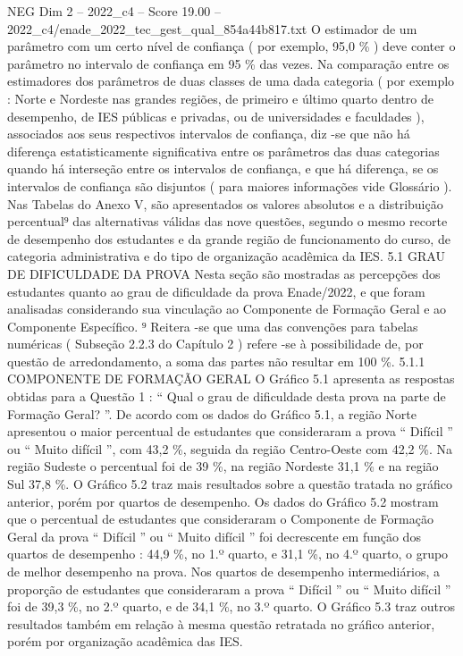 \begin{textsample}{NEG Dim 2 – 2022\_c4 – Score 19.00 – 2022\_c4/enade\_2022\_tec\_gest\_qual\_854a44b817.txt}
O estimador de um parâmetro com um certo nível de confiança ( por exemplo, 95,0 \% ) deve conter o parâmetro no intervalo de confiança em 95 \% das vezes.
Na comparação entre os estimadores dos parâmetros de duas classes de uma dada categoria ( por exemplo : Norte e Nordeste nas grandes regiões, de primeiro e último quarto dentro de desempenho, de IES públicas e privadas, ou de universidades e faculdades ), associados aos seus respectivos intervalos de confiança, diz -se que não há diferença estatisticamente significativa entre os parâmetros das duas categorias quando há interseção entre os intervalos de confiança, e que há diferença, se os intervalos de confiança são disjuntos ( para maiores informações vide Glossário ).
Nas Tabelas do Anexo V, são apresentados os valores absolutos e a distribuição percentual⁹ das alternativas válidas das nove questões, segundo o mesmo recorte de desempenho dos estudantes e da grande região de funcionamento do curso, de categoria administrativa e do tipo de organização acadêmica da IES. 5.1 GRAU DE DIFICULDADE DA PROVA Nesta seção são mostradas as percepções dos estudantes quanto ao grau de dificuldade da prova Enade/2022, e que foram analisadas considerando sua vinculação ao Componente de Formação Geral e ao Componente Específico. ⁹ Reitera -se que uma das convenções para tabelas numéricas ( Subseção 2.2.3 do Capítulo 2 ) refere -se à possibilidade de, por questão de arredondamento, a soma das partes não resultar em 100 \%. 5.1.1 COMPONENTE DE FORMAÇÃO GERAL O Gráfico 5.1 apresenta as respostas obtidas para a Questão 1 : “ Qual o grau de dificuldade desta prova na parte de Formação Geral? ”.
De acordo com os dados do Gráfico 5.1, a região Norte apresentou o maior percentual de estudantes que consideraram a prova “ Difícil ” ou “ Muito difícil ”, com 43,2 \%, seguida da região Centro-Oeste com 42,2 \%.
Na região Sudeste o percentual foi de 39 \%, na região Nordeste 31,1 \% e na região Sul 37,8 \%.
O Gráfico 5.2 traz mais resultados sobre a questão tratada no gráfico anterior, porém por quartos de desempenho.
Os dados do Gráfico 5.2 mostram que o percentual de estudantes que consideraram o Componente de Formação Geral da prova “ Difícil ” ou “ Muito difícil ” foi decrescente em função dos quartos de desempenho : 44,9 \%, no 1.º quarto, e 31,1 \%, no 4.º quarto, o grupo de melhor desempenho na prova.
Nos quartos de desempenho intermediários, a proporção de estudantes que consideraram a prova “ Difícil ” ou “ Muito difícil ” foi de 39,3 \%, no 2.º quarto, e de 34,1 \%, no 3.º quarto.
O Gráfico 5.3 traz outros resultados também em relação à mesma questão retratada no gráfico anterior, porém por organização acadêmica das IES.

\end{textsample}
